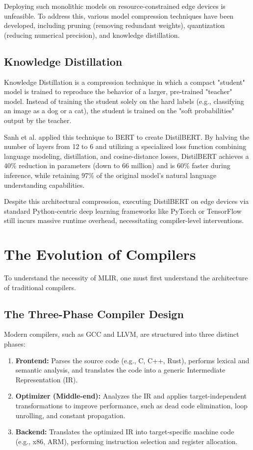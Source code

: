 Deploying such monolithic models on resource-constrained edge devices is unfeasible. To address this, various model compression techniques have been developed, including pruning (removing redundant weights), quantization (reducing numerical precision), and knowledge distillation.

\subsection{Knowledge Distillation}
Knowledge Distillation is a compression technique in which a compact "student" model is trained to reproduce the behavior of a larger, pre-trained "teacher" model. Instead of training the student solely on the hard labels (e.g., classifying an image as a dog or a cat), the student is trained on the "soft probabilities" output by the teacher.

Sanh et al. \cite{sanh2019distilbert} applied this technique to BERT to create DistilBERT. By halving the number of layers from 12 to 6 and utilizing a specialized loss function combining language modeling, distillation, and cosine-distance losses, DistilBERT achieves a 40\% reduction in parameters (down to 66 million) and is 60\% faster during inference, while retaining 97\% of the original model's natural language understanding capabilities.

Despite this architectural compression, executing DistilBERT on edge devices via standard Python-centric deep learning frameworks like PyTorch or TensorFlow still incurs massive runtime overhead, necessitating compiler-level interventions.

\section{The Evolution of Compilers}
To understand the necessity of MLIR, one must first understand the architecture of traditional compilers.

\subsection{The Three-Phase Compiler Design}
Modern compilers, such as GCC and LLVM, are structured into three distinct phases:
\begin{enumerate}
    \item \textbf{Frontend:} Parses the source code (e.g., C, C++, Rust), performs lexical and semantic analysis, and translates the code into a generic Intermediate Representation (IR).
    \item \textbf{Optimizer (Middle-end):} Analyzes the IR and applies target-independent transformations to improve performance, such as dead code elimination, loop unrolling, and constant propagation.
    \item \textbf{Backend:} Translates the optimized IR into target-specific machine code (e.g., x86, ARM), performing instruction selection and register allocation.
\end{enumerate}

